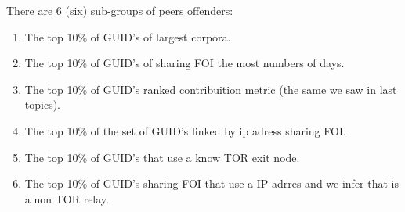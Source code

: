 \documentclass[notes]{beamer}
\begin{document}
\begin{frame}

\begin{block}{There are 6 (six) sub-groups of peers offenders:}

\begin{enumerate}

\item The top 10\% of GUID’s of largest corpora.

\item The top 10\% of GUID’s of sharing FOI the most numbers of days.

\item The top 10\% of GUID’s ranked contribuition metric (the same we saw in last topics).

\item The top 10\% of the set of GUID’s linked by ip adress sharing FOI.

\item The top 10\% of GUID’s that use a know TOR exit node.

\item The top 10\% of GUID’s  sharing FOI that use a IP adrres and we infer that is a non TOR relay.

\end{enumerate}

\end{block}

\end{frame}
\end{document}
